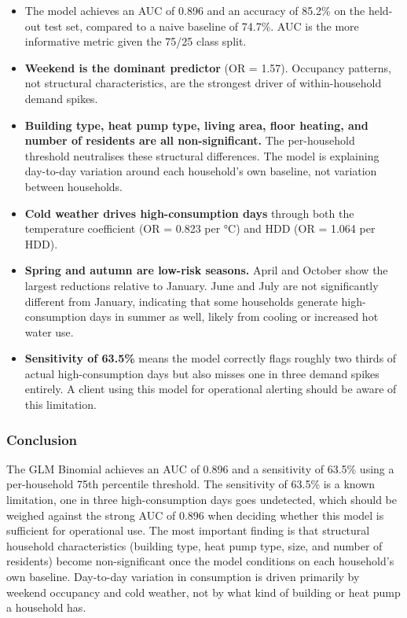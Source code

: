 \documentclass[
]{article}
\providecommand{\tightlist}{%
  \setlength{\itemsep}{0pt}\setlength{\parskip}{0pt}}
\begin{document}
\begin{itemize}
\tightlist
\item
  The model achieves an AUC of 0.896 and an accuracy of 85.2\% on the
  held-out test set, compared to a naive baseline of 74.7\%. AUC is the
  more informative metric given the 75/25 class split.
\item
  \textbf{Weekend is the dominant predictor} (OR = 1.57). Occupancy
  patterns, not structural characteristics, are the strongest driver of
  within-household demand spikes.
\item
  \textbf{Building type, heat pump type, living area, floor heating, and
  number of residents are all non-significant.} The per-household
  threshold neutralises these structural differences. The model is
  explaining day-to-day variation around each household's own baseline,
  not variation between households.
\item
  \textbf{Cold weather drives high-consumption days} through both the
  temperature coefficient (OR = 0.823 per °C) and HDD (OR = 1.064 per
  HDD).
\item
  \textbf{Spring and autumn are low-risk seasons.} April and October
  show the largest reductions relative to January. June and July are not
  significantly different from January, indicating that some households
  generate high-consumption days in summer as well, likely from cooling
  or increased hot water use.
\item
  \textbf{Sensitivity of 63.5\%} means the model correctly flags roughly
  two thirds of actual high-consumption days but also misses one in
  three demand spikes entirely. A client using this model for
  operational alerting should be aware of this limitation.
\end{itemize}

\subsubsection{Conclusion}\label{conclusion-2}

The GLM Binomial achieves an AUC of 0.896 and a sensitivity of 63.5\%
using a per-household 75th percentile threshold. The sensitivity of
63.5\% is a known limitation, one in three high-consumption days goes
undetected, which should be weighed against the strong AUC of 0.896 when
deciding whether this model is sufficient for operational use. The most
important finding is that structural household characteristics (building
type, heat pump type, size, and number of residents) become
non-significant once the model conditions on each household's own
baseline. Day-to-day variation in consumption is driven primarily by
weekend occupancy and cold weather, not by what kind of building or heat
pump a household has.
\end{document}
